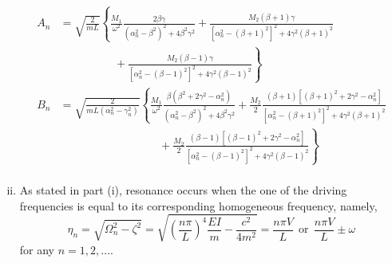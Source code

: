 \begin{enumerate}[(i)]
{\begin{equation}
    \begin{aligned}
        A_n &= \sqrt{\frac{2}{mL}} \left\{ \frac{M_1}{\omega^2} \frac{
            2\beta \gamma
        }{
            {\left(\alpha_n^2 - \beta^2\right)}^2 + 4\beta^2\gamma^2
        } + \frac{
            M_2(\beta + 1)\gamma
        }{
            {\left[\alpha_n^2 - {(\beta + 1)}^2 \right]}^2 + 4\gamma^2 {(\beta + 1)}^2
        }\right. \\
        &\qquad \qquad ~~~~ + \left. \frac{
            M_2(\beta - 1)\gamma
        }{
            {\left[\alpha_n^2 - {(\beta - 1)}^2 \right]}^2 + 4\gamma^2 {(\beta - 1)}^2
        } \right\} \\
        B_n &= \sqrt{\frac{2}{mL(\alpha_n^2 - \gamma_n^2)}} \left\{ \frac{M_1}{\omega^2} \frac{
            \beta\left(\beta^2 + 2\gamma^2 - \alpha_n^2\right)
        }{
            {\left(\alpha_n^2 - \beta^2\right)}^2 + 4\beta^2\gamma^2
        } + \frac{M_2}{2} \frac{
            (\beta + 1)\left[{(\beta + 1)}^2 + 2\gamma^2 - \alpha_n^2\right]
        }{
            {\left[\alpha_n^2 - {(\beta + 1)}^2 \right]}^2 + 4\gamma^2 {(\beta + 1)}^2
        }\right. \\
        &\qquad \qquad \qquad \qquad ~~~~ + \left. \frac{M_2}{2} \frac{
            (\beta - 1)\left[{(\beta - 1)}^2 + 2\gamma^2 - \alpha_n^2\right]
        }{
            {\left[\alpha_n^2 - {(\beta - 1)}^2 \right]}^2 + 4\gamma^2 {(\beta - 1)}^2
        } \right\} \\
    \end{aligned}
    \end{equation}
}
\item { %
    As stated in part (i), resonance occurs when the one of the driving frequencies is equal to its corresponding homogeneous frequency, namely, 
    \begin{equation}
        \eta_n = \sqrt{\Omega_n^2 - \zeta^2} = \sqrt{{\left(\frac{n\pi}{L}\right)}^4 \frac{EI}{m} - \frac{c^2}{4m^2}} = \frac{n\pi V}{L} ~~\textrm{or} ~~\frac{n\pi V}{L} \pm \omega
    \end{equation}
    for any $n = 1, 2, \ldots$.
}
\end{enumerate}